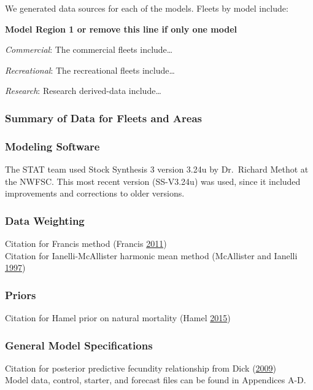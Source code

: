 \documentclass[12pt,]{article}
\begin{document}
We generated data sources for each of the models. Fleets by model
include:

\textbf{Model Region 1 or remove this line if only one model}

\emph{Commercial}: The commercial fleets include\ldots{}

\emph{Recreational}: The recreational fleets include\ldots{}

\emph{Research}: Research derived-data include\ldots{}

\subsubsection{Summary of Data for Fleets and
Areas}\label{summary-of-data-for-fleets-and-areas}

\subsubsection{Modeling Software}\label{modeling-software}

The STAT team used Stock Synthesis 3 version 3.24u by Dr.~Richard Methot
at the NWFSC. This most recent version (SS-V3.24u) was used, since it
included improvements and corrections to older versions.

\subsubsection{Data Weighting}\label{data-weighting}

Citation for Francis method (Francis
\protect\hyperlink{ref-Francis2011}{2011})\\
Citation for Ianelli-McAllister harmonic mean method (McAllister and
Ianelli \protect\hyperlink{ref-McAllister1997}{1997})

\subsubsection{Priors}\label{priors}

Citation for Hamel prior on natural mortality (Hamel
\protect\hyperlink{ref-Hamel2015}{2015})

\subsubsection{General Model
Specifications}\label{general-model-specifications}

Citation for posterior predictive fecundity relationship from Dick
(\protect\hyperlink{ref-Dick2009}{2009})\\
Model data, control, starter, and forecast files can be found in
Appendices A-D.
\end{document}
